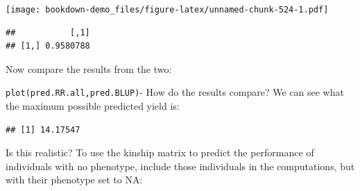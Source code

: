 \documentclass[
]{book}
\newenvironment{Shaded}{\begin{snugshade}}{\end{snugshade}}
\newcommand{\AttributeTok}[1]{\textcolor[rgb]{0.77,0.63,0.00}{#1}}
\newcommand{\ConstantTok}[1]{\textcolor[rgb]{0.00,0.00,0.00}{#1}}
\newcommand{\DecValTok}[1]{\textcolor[rgb]{0.00,0.00,0.81}{#1}}
\newcommand{\FunctionTok}[1]{\textcolor[rgb]{0.00,0.00,0.00}{#1}}
\newcommand{\NormalTok}[1]{#1}
\newcommand{\OtherTok}[1]{\textcolor[rgb]{0.56,0.35,0.01}{#1}}
\newcommand{\SpecialCharTok}[1]{\textcolor[rgb]{0.00,0.00,0.00}{#1}}
\begin{document}
\texttt{[image: bookdown-demo\_files/figure-latex/unnamed-chunk-524-1.pdf]}

\begin{Shaded}
\end{Shaded}

\begin{verbatim}
##           [,1]
## [1,] 0.9580788
\end{verbatim}

Now compare the results from the two:

\texttt{plot(pred.RR.all,pred.BLUP)}- How do the results compare? We can see what the maximum possible predicted yield is:

\begin{Shaded}
\end{Shaded}

\begin{verbatim}
## [1] 14.17547
\end{verbatim}

Is this realistic? To use the kinship matrix to predict the performance of individuals with no phenotype, include those individuals in the computations, but with their phenotype set to NA:

\begin{Shaded}
\end{Shaded}
\end{document}
